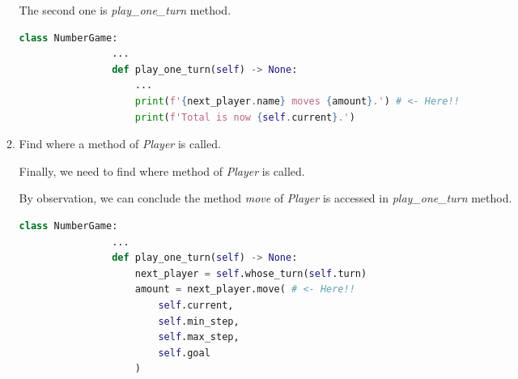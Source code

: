 \documentclass[12pt]{article}
\begin{document}
\begin{enumerate}[1.]
\begin{mdframed}
\begin{enumerate}[1.]
\begin{mdframed}
            \bigskip

            The second one is \textit{play\_one\_turn} method.

            \begin{lstlisting}[language=Python]
            class NumberGame:
                ...
                def play_one_turn(self) -> None:
                    ...
                    print(f'{next_player.name} moves {amount}.') # <- Here!!
                    print(f'Total is now {self.current}.')
            \end{lstlisting}

            \end{mdframed}

            \item Find where a method of \textit{Player} is called.

            \bigskip

            \begin{mdframed}

            Finally, we need to find where method of \textit{Player} is
            called.

            \bigskip

            By observation, we can conclude the method \textit{move} of \textit{Player}
            is accessed in \textit{play\_one\_turn} method.

            \bigskip

            \begin{lstlisting}[language=Python]
            class NumberGame:
                ...
                def play_one_turn(self) -> None:
                    next_player = self.whose_turn(self.turn)
                    amount = next_player.move( # <- Here!!
                        self.current,
                        self.min_step,
                        self.max_step,
                        self.goal
                    )
            \end{lstlisting}

            \end{mdframed}
        \end{enumerate}

    \end{mdframed}
\end{enumerate}
\end{document}
